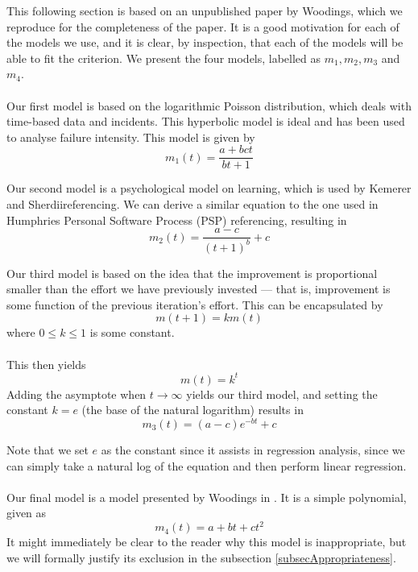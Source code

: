 This following section is based on an unpublished paper by Woodings, which we
reproduce for the completeness of the paper.
It is a good motivation for each of the models we use, and it is clear, by
inspection, that each of the models will be able to fit the criterion.
We present the four models, labelled as $m_1, m_2, m_3$ and $m_4$.\\
\\
Our first model is based on the logarithmic Poisson distribution, which
deals with time-based data and incidents.
This hyperbolic model is ideal and has been used to analyse failure intensity.
This model is given by
\begin{equation} \label{modelOne}
  m_1(t) = \frac{a+bct}{bt+1}
\end{equation}

Our second model is a psychological model on learning, which is used by Kemerer
and Sherdii\FIXME referencing.
We can derive a similar equation to the one used in Humphries Personal Software
Process (PSP) \FIXME referencing, resulting in
\begin{equation} \label{modelTwo}
  m_2(t) = \frac{a-c}{(t+1)^{b}}+c
\end{equation}

Our third model is based on the idea that the improvement is proportional
smaller than
the effort we have previously invested --- that is, improvement is some function of the
previous iteration's effort.
This can be encapsulated by 
\[
  m(t+1) = k m(t)
\]
where $0 \leq k \leq 1$ is some constant.\\
\\
This then yields
\[
  m(t) = k^t 
\]
Adding the asymptote when $t \to \infty$ yields our third model, and setting the
constant $k = e$ (the base of the natural logarithm) results in
\begin{equation} \label{modelThree}
  m_3(t) = (a-c) e^{-bt} + c
\end{equation}

Note that we set $e$ as the constant since it assists in regression analysis,
since we can simply take a natural log of the equation and then perform linear
regression.\\
\\
Our final model is a model presented by Woodings in \FIXME.
It is a simple polynomial, given as
\begin{equation} \label{modelFour}
  m_4(t) = a + bt + ct^2
\end{equation}
It might immediately be clear to the reader why this model is inappropriate, but
we will formally justify its exclusion in the subsection \ref{subsecAppropriateness}.

